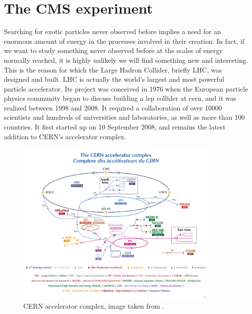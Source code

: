 \documentclass[../../main.tex]{subfiles}
\begin{document}
\chapter{The CMS experiment}
\label{sec:CMS_exp}

Searching for exotic particles never observed before implies a need for an enormous amount of energy in the processes involved in their creation. In fact, if we want to study something never observed before at the scales of energy normally reached, it is highly unlikely we will find something new and interesting. This is the reason for which the Large Hadron Collider, briefly LHC, was designed and built. LHC is actually the world’s largest and most powerful particle accelerator. Its project was conceived in 1976 when the European particle physics community began to discuss building a \acrfull{lep} collider at \acrshort{cern}, and it was realized between 1998 and 2008. It required a collaboration of over 10000 scientists and hundreds of universities and laboratories, as well as more than 100 countries. It first started up on 10 September 2008, and remains the latest addition to CERN’s accelerator complex.

\begin{figure}[h]
    \centering
    \includegraphics[width=0.9\textwidth]{sections/01/Images/Cern_acc_complex.png}
    \caption{CERN accelerator complex, image taken from \cite{LHC-Acc}.}
    \label{fig:CERN_ACC}
\end{figure}  
    
\end{document}
